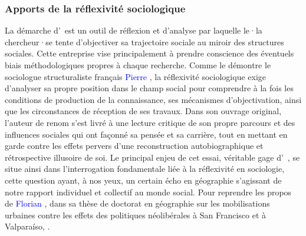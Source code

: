 \begin{refsegment}
\subsubsection*{Apports de la réflexivité sociologique
    \label{chap3:theorie-auto-analyse-sociologique}
    }
    
La démarche d'~est un outil de réflexion et d'analyse par laquelle le·la chercheur·se tente d'objectiver sa trajectoire sociale au miroir des structures sociales. Cette entreprise vise principalement à prendre conscience des éventuels biais méthodologiques propres à chaque recherche. Comme le démontre le sociologue structuraliste français \textcolor{blue}{Pierre} \textcolor{blue}{\textcite[162]{bourdieu_esquisse_2004}}, la réflexivité sociologique exige d'analyser sa propre position dans le champ social pour comprendre à la fois les conditions de production de la connaissance, ses mécanismes d'objectivation, ainsi que les circonstances de réception de ses travaux. Dans son ouvrage original, l'auteur de renom s'est livré à une lecture critique de son propre parcours et des influences sociales qui ont façonné sa pensée et sa carrière, tout en mettant en garde contre les effets pervers d'une reconstruction autobiographique et rétrospective illusoire de soi. Le principal enjeu de cet essai, véritable gage d'~\textcolor{blue}{\autocite[3]{roza_p_2006}}, se situe ainsi dans l'interrogation fondamentale liée à la réflexivité en sociologie, cette question ayant, à nos yeux, un certain écho en géographie s'agissant de notre rapport individuel et collectif au monde social. Pour reprendre les propos de \textcolor{blue}{Florian} \textcolor{blue}{\textcite[71]{opillard_we_2018}}, dans sa thèse de doctorat en géographie sur les mobilisations urbaines contre les effets des politiques néolibérales à San Francisco et à Valparaíso, .%


\end{refsegment}
